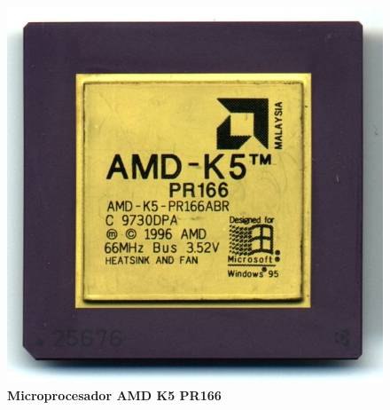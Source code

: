 \begin{figure}[htb]
	\centering
	\includegraphics[scale = 0.8]{Graphics/amd-k5 PR166.jpg}
	\caption{\textbf{Microprocesador AMD K5 PR166}}
	\label{fig:27}
\end{figure}

